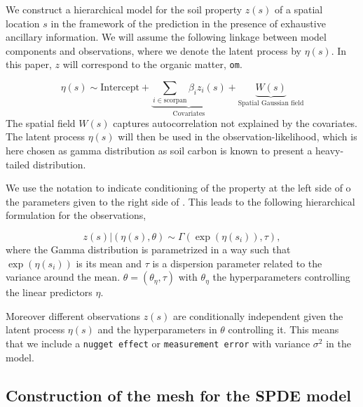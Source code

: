 \documentclass[
  a4paper,
]{article}
\begin{document}
We construct a hierarchical model for the soil property \(z(s)\) of a
spatial location \(s\) in the framework of the prediction in the
presence of exhaustive ancillary information. We will assume the
following linkage between model components and observations, where we
denote the latent process by \(\eta(s)\). In this paper, \(z\) will
correspond to the organic matter, \texttt{om}.

\[
\eta(s) \sim {\text{Intercept}} + \underbrace{ \sum_{i\in \text{scorpan}}\beta_i z_i(s)}_{\text{Covariates} } +\underbrace{W(s)}_{\text{Spatial Gaussian field}}
\] The spatial field \(W(s)\) captures autocorrelation not explained by
the covariates. The latent process \(\eta(s)\) will then be used in the
observation-likelihood, which is here chosen as gamma distribution as
soil carbon is known to present a heavy-tailed distribution.

We use the \texttt{\textbar{}} notation to indicate conditioning of the
property at the left side of \texttt{\textbar{}} o the parameters given
to the right side of \texttt{\textbar{}}. This leads to the following
hierarchical formulation for the observations,

\[
z(s) | (\eta(s),\theta) \sim \Gamma(\exp(\eta(s_i)), \tau),
\] where the Gamma distribution is parametrized in a way such that
\(\exp(\eta(s_i))\) is its mean and \(\tau\) is a dispersion parameter
related to the variance around the mean.
\(\theta = (\theta_\eta, \tau)\) with \(\theta_\eta\) the
hyperparameters controlling the linear predictors \(\eta\).

Moreover different observations \(z(s)\) are conditionally independent
given the latent process \(\eta(s)\) and the hyperparameters in
\(\theta\) controlling it. This means that we include a
\texttt{nugget\ effect} or \texttt{measurement\ error} with variance
\(\sigma^2\) in the model.

\hypertarget{construction-of-the-mesh-for-the-spde-model}{%
\subsection{Construction of the mesh for the SPDE
model}\label{construction-of-the-mesh-for-the-spde-model}}
\end{document}
